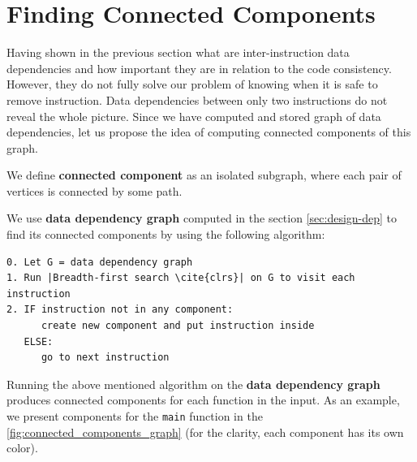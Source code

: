 \documentclass[12pt, twoside]{fithesis2}
\renewcommand{\_}{\leavevmode \kern0.07em\vbox{\hrule width0.4em}}
\begin{document}
\section{Finding Connected Components}
\label{sec:design-components}

Having shown in the previous section what are inter-instruction data
dependencies and how important they are in relation to the code consistency.
However, they do not fully solve our problem of knowing when it is safe to
remove instruction.
Data dependencies between only two instructions do not reveal the whole picture.
Since we have computed and stored graph of data dependencies, let us propose the
idea of computing connected components of this graph.

\bigskip

We define \textbf{connected component} as an isolated subgraph, where
each pair of vertices is connected by some path.

We use \textbf{data dependency graph} computed in the section
\autoref{sec:design-dep} to find its connected components by using the following
algorithm:

\begin{verbatim}
0. Let G = data dependency graph
1. Run |Breadth-first search \cite{clrs}| on G to visit each instruction
2. IF instruction not in any component:
      create new component and put instruction inside
   ELSE:
      go to next instruction
\end{verbatim}

Running the above mentioned algorithm on the \textbf{data dependency graph}
produces connected components for each function in the input.
As an example, we present components for the \texttt{main} function
in the \autoref{fig:connected_components_graph} (for the clarity, each component
has its own color).
\end{document}
